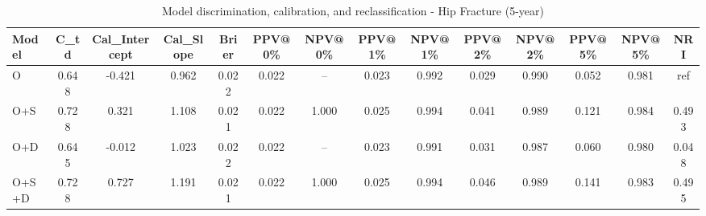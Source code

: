 \begin{table}[htbp]
\centering
\small
\caption{Model discrimination, calibration, and reclassification - Hip Fracture (5-year)}
\label{tab:perf_pd_5y}
\begin{tabular}{lccccccccccccc}
\toprule
Model & C\_td & Cal\_Intercept & Cal\_Slope & Brier & PPV@0\% & NPV@0\% & PPV@1\% & NPV@1\% & PPV@2\% & NPV@2\% & PPV@5\% & NPV@5\% & NRI \\
\midrule
O & 0.648 & -0.421 & 0.962 & 0.022 & 0.022 & -- & 0.023 & 0.992 & 0.029 & 0.990 & 0.052 & 0.981 & ref \\
O+S & 0.728 & 0.321 & 1.108 & 0.021 & 0.022 & 1.000 & 0.025 & 0.994 & 0.041 & 0.989 & 0.121 & 0.984 & 0.493 \\
O+D & 0.645 & -0.012 & 1.023 & 0.022 & 0.022 & -- & 0.023 & 0.991 & 0.031 & 0.987 & 0.060 & 0.980 & 0.048 \\
O+S+D & 0.728 & 0.727 & 1.191 & 0.021 & 0.022 & 1.000 & 0.025 & 0.994 & 0.046 & 0.989 & 0.141 & 0.983 & 0.495 \\
\bottomrule
\end{tabular}
\end{table}